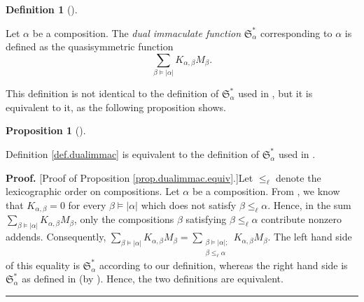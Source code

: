 \documentclass[numbers=enddot,12pt,final,onecolumn,notitlepage,abstracton]{scrartcl}%
\theoremstyle{definition}
\newtheorem{prop}[theo]{Proposition}
\newenvironment{proposition}[1][]
{\begin{prop}[#1]\begin{leftbar}}
{\end{leftbar}\end{prop}}
\newtheorem{defi}[theo]{Definition}
\newenvironment{definition}[1][]
{\begin{defi}[#1]\begin{leftbar}}
{\end{leftbar}\end{defi}}
\newenvironment{proof}[1][Proof]{\noindent\textbf{#1.} }{\ \rule{0.5em}{0.5em}}
\newenvironment{vershort}{}{}
\let\sumnonlimits\sum
\renewcommand{\sum}{\sumnonlimits\limits}
\begin{document}
\begin{definition}
\label{def.dualimmac}Let $\alpha$ be a composition. The \textit{dual
immaculate function }$\mathfrak{S}_{\alpha}^{\ast}$ corresponding to $\alpha$
is defined as the quasisymmetric function%
\[
\sum_{\beta\models\left\vert \alpha\right\vert }K_{\alpha,\beta}M_{\beta}.
\]

\end{definition}

This definition is not identical to the definition of $\mathfrak{S}_{\alpha
}^{\ast}$ used in \cite{BBSSZ}, but it is equivalent to it, as the following
proposition shows.

\begin{proposition}
\label{prop.dualimmac.equiv}Definition \ref{def.dualimmac} is equivalent to
the definition of $\mathfrak{S}_{\alpha}^{\ast}$ used in \cite{BBSSZ}.
\end{proposition}

\begin{vershort}
\begin{proof}
[Proof of Proposition \ref{prop.dualimmac.equiv}.]Let $\leq_{\ell}$ denote the
lexicographic order on compositions. Let $\alpha$ be a composition. From
\cite[Proposition 3.15 (2)]{BBSSZ}, we know that $K_{\alpha,\beta}=0$ for
every $\beta\models\left\vert \alpha\right\vert $ which does not satisfy
$\beta\leq_{\ell}\alpha$. Hence, in the sum $\sum_{\beta\models\left\vert
\alpha\right\vert }K_{\alpha,\beta}M_{\beta}$, only the compositions $\beta$
satisfying $\beta\leq_{\ell}\alpha$ contribute nonzero addends. Consequently,
$\sum_{\beta\models\left\vert \alpha\right\vert }K_{\alpha,\beta}M_{\beta
}=\sum_{\substack{\beta\models\left\vert \alpha\right\vert ;\\\beta\leq_{\ell
}\alpha}}K_{\alpha,\beta}M_{\beta}$. The left hand side of this equality is
$\mathfrak{S}_{\alpha}^{\ast}$ according to our definition, whereas the right
hand side is $\mathfrak{S}_{\alpha}^{\ast}$ as defined in \cite{BBSSZ} (by
\cite[Proposition 3.36]{BBSSZ}). Hence, the two definitions are equivalent.
\end{proof}
\end{vershort}
\end{document}
